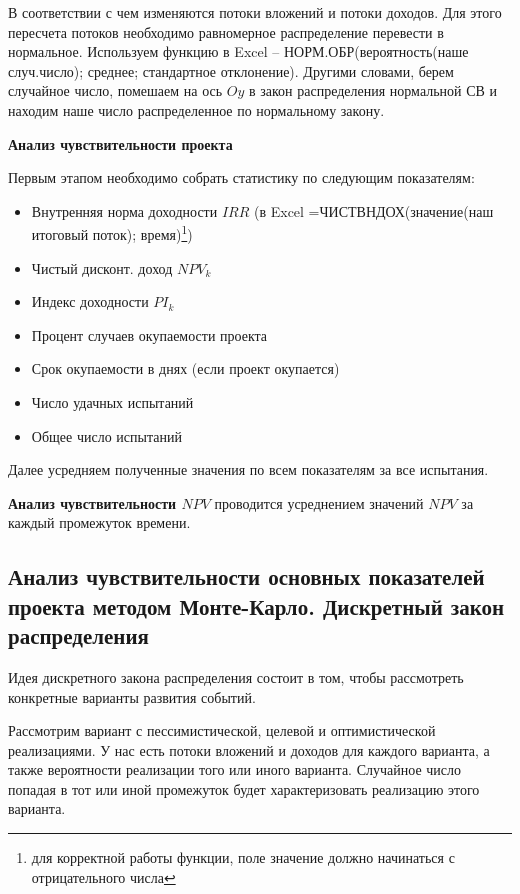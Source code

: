 \documentclass[reqno]{article}
\theoremstyle{definition}
\theoremstyle{definition}
\theoremstyle{definition}
\theoremstyle{definition}
\theoremstyle{definition}
\theoremstyle{definition}
\theoremstyle{definition}
\theoremstyle{definition}
\theoremstyle{definition}
\begin{document}
	В соответствии с чем изменяются потоки вложений и потоки доходов. Для этого пересчета потоков необходимо равномерное распределение перевести в нормальное. Используем функцию в Excel -- НОРМ.ОБР(вероятность(наше случ.число); среднее; стандартное отклонение). Другими словами, берем случайное число, помешаем на ось $Oy$ в закон распределения нормальной СВ и находим наше число распределенное по нормальному закону. 
	
	\textbf{Анализ чувствительности проекта}
	
	Первым этапом необходимо собрать статистику по следующим показателям:
	
	\begin{itemize}
		\item Внутренняя норма доходности $IRR$ (в Excel =ЧИСТВНДОХ(значение(наш итоговый поток); время)\footnote{для корректной работы функции, поле значение должно начинаться с отрицательного числа})
		
		\item Чистый дисконт. доход $NPV_k$
		
		\item Индекс доходности $PI_k$
		
		\item Процент случаев окупаемости проекта
		
		\item Срок окупаемости в днях (если проект окупается) 
		
		\item Число удачных испытаний
		
		\item Общее число испытаний
	\end{itemize}
	
	Далее усредняем полученные значения по всем показателям за все испытания.
	
	\textbf{Анализ чувствительности $NPV$} проводится усреднением значений $NPV$ за каждый промежуток времени.
	
	\subsection{Анализ чувствительности основных показателей проекта методом Монте-Карло. Дискретный закон распределения}
	
	Идея дискретного закона распределения состоит в том, чтобы рассмотреть конкретные варианты развития событий. 
	
	Рассмотрим вариант с пессимистической, целевой и оптимистической реализациями. У нас есть потоки вложений и доходов для каждого варианта, а также вероятности реализации того или иного варианта. Случайное число попадая в тот или иной промежуток будет характеризовать реализацию этого варианта. 
	
\end{document}
